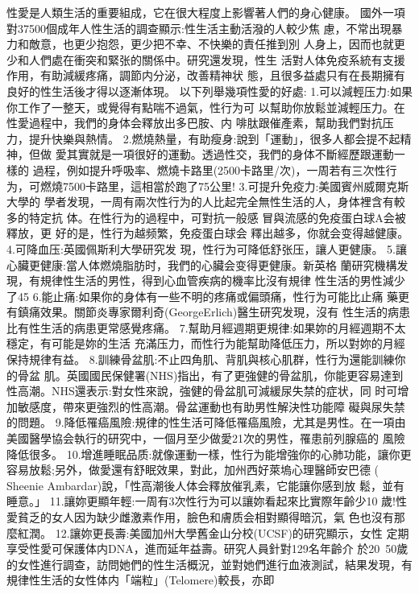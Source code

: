 \documentclass[12pt,UTF8]{ctexbook}
\begin{document}
性愛是人類生活的重要組成，它在很大程度上影響著人們的身心健康。
國外一項對37500個成年人性生活的調查顯示:性生活主動活潑的人較少焦
慮，不常出現暴力和敵意，也更少抱怨，更少把不幸、不快樂的責任推到別
人身上，因而也就更少和人們處在衝突和緊张的關係中。研究還发現，性生
活對人体免疫系統有支援作用，有助減緩疼痛，調節内分泌，改善精神状
態，且很多益處只有在長期擁有良好的性生活後才得以逐漸体現。
以下列舉幾項性愛的好處:
1.可以減輕压力:如果你工作了一整天，或覺得有點喘不過氣，性行为可
以幫助你放鬆並減輕压力。在性愛過程中，我們的身体会釋放出多巴胺、内
啡肽跟催產素，幫助我們對抗压力，提升快樂與熱情。
2.燃燒熱量，有助瘦身:說到「運動」，很多人都会提不起精神，但做
愛其實就是一項很好的運動。透過性交，我們的身体不斷經歷跟運動一樣的
過程，例如提升呼吸率、燃燒卡路里(2500卡路里/次)，一周若有三次性行
为，可燃燒7500卡路里，這相當於跑了75公里!
3.可提升免疫力:美國賓州威爾克斯大學的
學者发現，一周有兩次性行为的人比起完全無性生活的人，身体裡含有較多的特定抗
体。在性行为的過程中，可對抗一般感
冒與流感的免疫蛋白球A会被釋放，更
好的是，性行为越频繁，免疫蛋白球会
釋出越多，你就会变得越健康。
4.可降血压:英國佩斯利大學研究发
現，性行为可降低舒张压，讓人更健康。
5.讓心臟更健康:當人体燃燒脂肪时，我們的心臟会变得更健康。新英格
蘭研究機構发現，有規律性生活的男性，得到心血管疾病的機率比沒有規律
性生活的男性減少了45%
6.能止痛:如果你的身体有一些不明的疼痛或偏頭痛，性行为可能比止痛
藥更有鎮痛效果。關節炎專家爾利奇(GeorgeErlich)醫生研究发現，沒有
性生活的病患比有性生活的病患更常感覺疼痛。
7.幫助月經週期更規律:如果妳的月經週期不太穩定，有可能是妳的生活
充滿压力，而性行为能幫助降低压力，所以對妳的月經保持規律有益。
8.訓練骨盆肌:不止四角肌、背肌與核心肌群，性行为還能訓練你的骨盆
肌。英國國民保健署(NHS)指出，有了更強健的骨盆肌，你能更容易達到
性高潮。NHS還表示:對女性來說，強健的骨盆肌可減緩尿失禁的症状，同
时可增加敏感度，帶來更強烈的性高潮。骨盆運動也有助男性解決性功能障
礙與尿失禁的問題。
9.降低罹癌風險:規律的性生活可降低罹癌風險，尤其是男性。在一項由
美國醫學協会執行的研究中，一個月至少做愛21次的男性，罹患前列腺癌的
風險降低很多。
10.增進睡眠品质:就像運動一樣，性行为能增強你的心肺功能，讓你更
容易放鬆;另外，做愛還有舒眠效果，對此，加州西好萊塢心理醫師安巴德
( Sheenie Ambardar)說，「性高潮後人体会釋放催乳素，它能讓你感到放
鬆，並有睡意。」
11.讓妳更顯年輕:一周有3次性行为可以讓妳看起來比實際年齡少10
歲!性愛貧乏的女人因为缺少雌激素作用，臉色和膚质会相對顯得暗沉，氣
色也沒有那麼紅潤。
12.讓妳更長壽:美國加州大學舊金山分校(UCSF)的研究顯示，女性
定期享受性愛可保護体内DNA，進而延年益壽。研究人員針對129名年齡介
於20~50歲的女性進行調查，訪問她們的性生活概況，並對她們進行血液測試，結果发現，有規律性生活的女性体内「端粒」(Telomere)較長，亦即
\end{document}
